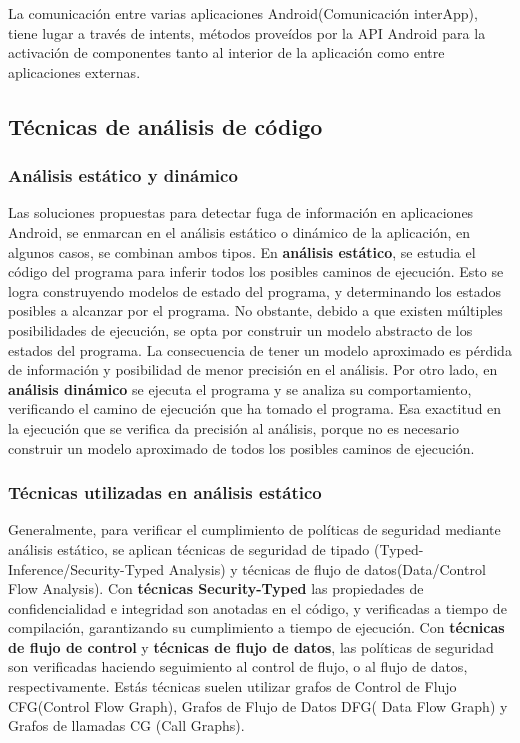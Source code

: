 La comunicación entre varias aplicaciones Android(Comunicación interApp), tiene
lugar a través de intents\cite{App-Intent}, métodos proveídos por la API Android
para la activación de componentes tanto al interior de la aplicación como entre
aplicaciones externas. 

\subsection{Técnicas de análisis de código}
\subsubsection{Análisis estático y dinámico}
Las soluciones propuestas para detectar fuga de información en aplicaciones
Android, se enmarcan en el análisis estático o dinámico de la aplicación, en
algunos casos, se combinan ambos tipos.\newline 
En \textbf{análisis estático}\cite{Static-dynamic}, se estudia el código del
programa para inferir todos los posibles caminos de ejecución. Esto se logra
construyendo modelos de estado del programa, y determinando los estados posibles
a alcanzar por el programa.
No obstante, debido a que existen múltiples posibilidades de ejecución, se opta
por construir un modelo abstracto de los estados del programa. La consecuencia
de tener un modelo aproximado es pérdida de información y posibilidad de menor
precisión en el análisis.\newline 
Por otro lado, en \textbf{análisis dinámico} se ejecuta el programa y se analiza
su comportamiento, verificando el camino de ejecución que ha tomado el programa.
Esa exactitud en la ejecución que se verifica da precisión al análisis, porque
no es necesario construir un modelo aproximado de todos los posibles caminos de
ejecución.

\subsubsection{Técnicas utilizadas en análisis estático} 
Generalmente, para verificar el cumplimiento de políticas de seguridad mediante
análisis estático, se aplican técnicas de seguridad de tipado
(Typed-Inference/Security-Typed Analysis) y técnicas de flujo de
datos(Data/Control Flow Analysis)\cite{Information-Flow-Java}.\newline 
Con \textbf{técnicas Security-Typed} las propiedades de confidencialidad e
integridad son anotadas en el código, y verificadas a tiempo de compilación,
garantizando su cumplimiento a tiempo de ejecución.\newline 
Con \textbf{técnicas de flujo de control} y \textbf{técnicas de flujo de datos},
las políticas de seguridad son verificadas haciendo seguimiento al control de
flujo, o al flujo de datos, respectivamente. Estás técnicas suelen utilizar
grafos de Control de Flujo CFG(Control Flow Graph), Grafos de Flujo de Datos
DFG( Data Flow Graph) y Grafos de llamadas CG (Call Graphs).

